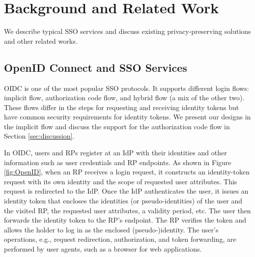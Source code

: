 \section{Background and Related Work}
\label{sec:background}

We describe %
typical SSO services and discuss existing privacy-preserving solutions and other related works.

\subsection{OpenID Connect and SSO Services}
\label{subsec:OIDC}
OIDC is one of the most popular SSO protocols. It supports different login flows: implicit flow, authorization code flow, and hybrid flow (a mix of the other two). These flows differ in the steps for requesting and receiving identity tokens but have common security requirements for identity tokens. We present our designs in the implicit flow and discuss the support for the authorization code flow in Section \ref{sec:discussion}.

In OIDC, users and RPs register at an IdP with their identities
and other information such as user credentials %
and RP endpoints. %
As shown in Figure \ref{fig:OpenID}, when an RP receives a login request, it constructs an identity-token request with its own identity and the scope of requested user attributes.
This request is redirected to the IdP. Once the IdP authenticates the user, it issues an identity token that encloses the identities (or pseudo-identities) of the user and the visited RP, the requested user attributes, a validity period, etc. The user then forwards the identity token to the RP's endpoint. The RP verifies the token and allows the holder to log in as the enclosed (pseudo-)identity. The user's operations, e.g., request redirection, authorization, and token forwarding, are performed by user agents, such as a browser for web applications.

